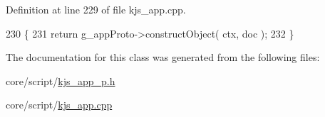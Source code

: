 Definition at line 229 of file kjs\+\_\+app.\+cpp.


\begin{DoxyCode}
230 \{
231     \textcolor{keywordflow}{return} g\_appProto->constructObject( ctx, doc );
232 \}
\end{DoxyCode}


The documentation for this class was generated from the following files\+:\begin{DoxyCompactItemize}
\item 
core/script/\hyperlink{kjs__app__p_8h}{kjs\+\_\+app\+\_\+p.\+h}\item 
core/script/\hyperlink{kjs__app_8cpp}{kjs\+\_\+app.\+cpp}\end{DoxyCompactItemize}
